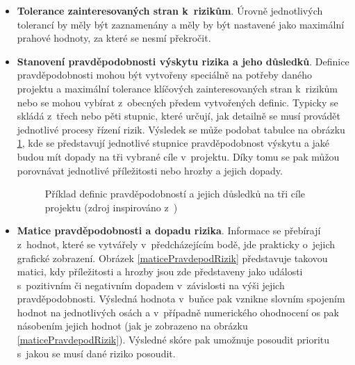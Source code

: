 \begin{itemize}
    \item \textbf{Tolerance zainteresovaných stran k~rizikům}. Úrovně jednotlivých tolerancí by měly být zaznamenány a měly by být nastavené jako maximální prahové hodnoty, za které se nesmí překročit.
    \item \textbf{Stanovení pravděpodobnosti výskytu rizika a jeho důsledků}. Definice pravděpodobnosti mohou být vytvořeny speciálně na potřeby daného projektu a maximální tolerance klíčových zainteresovaných stran k~rizikům nebo se mohou vybírat z~obecných předem vytvořených definic. Typicky se skládá z~třech nebo pěti stupnic, které určují, jak detailně se musí provádět jednotlivé procesy řízení rizik. Výsledek se může podobat tabulce na obrázku \ref{pravdepodRizik}, kde se představují jednotlivé stupnice pravděpodobnost výskytu a jaké budou mít dopady na tři vybrané cíle v~projektu. Díky tomu se pak můžou porovnávat jednotlivé příležitosti nebo hrozby a jejich dopady.
    
    \begin{figure}[ht]
    \begin{center}
    \caption{Příklad definic pravděpodobností a jejich důsledků na tři cíle projektu (zdroj inspirováno z~\cite{PMBOK})}
    \label{pravdepodRizik}
    \end{center}
    \end{figure}

    \item \textbf{Matice pravděpodobnosti a dopadu rizika}. Informace se přebírají z~hodnot, které se vytvářely v~předcházejícím bodě, jde prakticky o~jejich grafické zobrazení. Obrázek \ref{maticePravdepodRizik} představuje takovou matici, kdy příležitosti a hrozby jsou zde představeny jako události s~pozitivním či negativním dopadem v~závislosti na výši jejich pravděpodobnosti. Výsledná hodnota v~buňce pak vznikne slovním spojením hodnot na jednotlivých osách a v~případně numerického ohodnocení os pak násobením jejich hodnot (jak je zobrazeno na obrázku \ref{maticePravdepodRizik}). Výsledné skóre pak umožnuje posoudit prioritu s~jakou se musí dané riziko posoudit.
    

\end{itemize}
